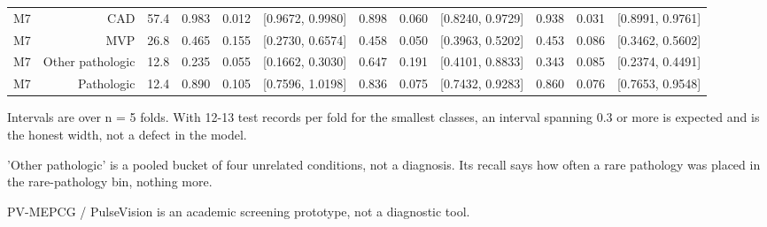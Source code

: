 \begin{table}[htbp]
\begin{tabular}{lrrrrrrrrrrr}
    M7 & CAD & 57.4 & 0.983 & 0.012 & [0.9672, 0.9980] & 0.898 & 0.060 & [0.8240, 0.9729] & 0.938 & 0.031 & [0.8991, 0.9761] \\
    M7 & MVP & 26.8 & 0.465 & 0.155 & [0.2730, 0.6574] & 0.458 & 0.050 & [0.3963, 0.5202] & 0.453 & 0.086 & [0.3462, 0.5602] \\
    M7 & Other pathologic & 12.8 & 0.235 & 0.055 & [0.1662, 0.3030] & 0.647 & 0.191 & [0.4101, 0.8833] & 0.343 & 0.085 & [0.2374, 0.4491] \\
    M7 & Pathologic & 12.4 & 0.890 & 0.105 & [0.7596, 1.0198] & 0.836 & 0.075 & [0.7432, 0.9283] & 0.860 & 0.076 & [0.7653, 0.9548] \\
    \bottomrule
  \end{tabular}
  \par\footnotesize Intervals are over n = 5 folds. With 12-13 test records per fold for the smallest classes, an interval spanning 0.3 or more is expected and is the honest width, not a defect in the model.
  \par\footnotesize 'Other pathologic' is a pooled bucket of four unrelated conditions, not a diagnosis. Its recall says how often a rare pathology was placed in the rare-pathology bin, nothing more.
  \par\footnotesize PV-MEPCG / PulseVision is an academic screening prototype, not a diagnostic tool.
\end{table}
